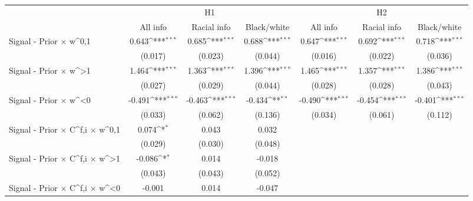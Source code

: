 {
\def\sym#1{\ifmmode^{#1}\else\(^{#1}\)\fi}
\begin{tabular}{l*{6}{c}}
\hline\hline
                    &\multicolumn{3}{c}{H1}                                           &\multicolumn{3}{c}{H2}                                           \\\cmidrule(lr){2-4}\cmidrule(lr){5-7}
                    &    All info         & Racial info         & Black/white         &    All info         & Racial info         & Black/white         \\
\hline
Signal - Prior $\times$ w^{0,1}&       0.643\sym{***}&       0.685\sym{***}&       0.688\sym{***}&       0.647\sym{***}&       0.692\sym{***}&       0.718\sym{***}\\
                    &     (0.017)         &     (0.023)         &     (0.044)         &     (0.016)         &     (0.022)         &     (0.036)         \\
Signal - Prior $\times$ w^{>1}&       1.464\sym{***}&       1.363\sym{***}&       1.396\sym{***}&       1.465\sym{***}&       1.357\sym{***}&       1.386\sym{***}\\
                    &     (0.027)         &     (0.029)         &     (0.044)         &     (0.028)         &     (0.028)         &     (0.043)         \\
Signal - Prior $\times$ w^{<0}&      -0.491\sym{***}&      -0.463\sym{***}&      -0.434\sym{**} &      -0.490\sym{***}&      -0.454\sym{***}&      -0.401\sym{***}\\
                    &     (0.033)         &     (0.062)         &     (0.136)         &     (0.034)         &     (0.061)         &     (0.112)         \\
Signal - Prior $\times$ C^{f,i} $\times$ w^{0,1}&       0.074\sym{*}  &       0.043         &       0.032         &                     &                     &                     \\
                    &     (0.029)         &     (0.030)         &     (0.048)         &                     &                     &                     \\
Signal - Prior $\times$ C^{f,i} $\times$ w^{>1}&      -0.086\sym{*}  &       0.014         &      -0.018         &                     &                     &                     \\
                    &     (0.043)         &     (0.043)         &     (0.052)         &                     &                     &                     \\
Signal - Prior $\times$ C^{f,i} $\times$ w^{<0}&      -0.001         &       0.014         &      -0.047         &                     &                     &                     \\

\end{tabular}}
